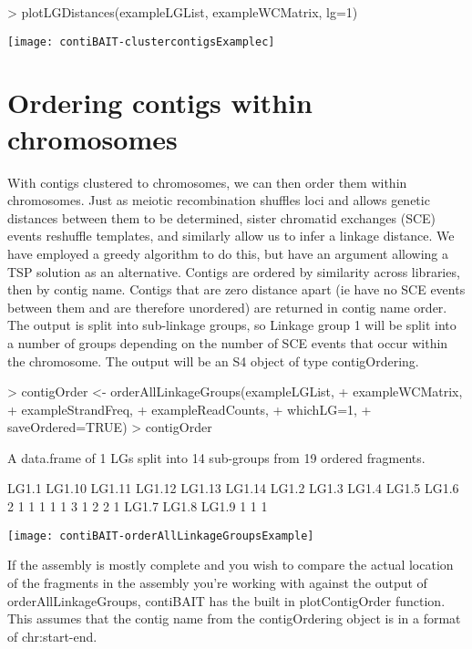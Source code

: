 \documentclass{article}
\begin{document}
\begin{Schunk}
\begin{Sinput}
> plotLGDistances(exampleLGList, exampleWCMatrix, lg=1)
\end{Sinput}
\end{Schunk}
\texttt{[image: contiBAIT-clustercontigsExamplec]}


\section{Ordering contigs within chromosomes}

With contigs clustered to chromosomes, we can then order them within chromosomes. Just as meiotic recombination shuffles loci and allows genetic distances between them to be determined, sister chromatid exchanges (SCE) events reshuffle templates, and similarly allow us to infer a linkage distance. We have employed a greedy algorithm to do this, but have an argument allowing a TSP solution as an alternative. Contigs are ordered by similarity across libraries, then by contig name. Contigs that are zero distance apart (ie have no SCE events between them and are therefore unordered) are returned in contig name order. The output is split into sub-linkage groups, so Linkage group 1 will be split into a number of groups depending on the number of SCE events that occur within the chromosome. The output will be an S4 object of type contigOrdering.

\begin{Schunk}
\begin{Sinput}
> contigOrder <- orderAllLinkageGroups(exampleLGList,
+ exampleWCMatrix,
+ exampleStrandFreq,
+ exampleReadCounts,
+ whichLG=1,
+ saveOrdered=TRUE)
> contigOrder
\end{Sinput}
\begin{Soutput}
A data.frame of 1 LGs split into 14 sub-groups from 19 ordered fragments.

 LG1.1 LG1.10 LG1.11 LG1.12 LG1.13 LG1.14  LG1.2  LG1.3  LG1.4  LG1.5  LG1.6 
     2      1      1      1      1      1      3      1      2      2      1 
 LG1.7  LG1.8  LG1.9 
     1      1      1 
\end{Soutput}
\end{Schunk}
\texttt{[image: contiBAIT-orderAllLinkageGroupsExample]}

If the assembly is mostly complete and you wish to compare the actual location of the fragments in the assembly you're working with against the output of orderAllLinkageGroups, contiBAIT has the built in plotContigOrder function. This assumes that the contig name from the contigOrdering object is in a format of chr:start-end.
\end{document}

